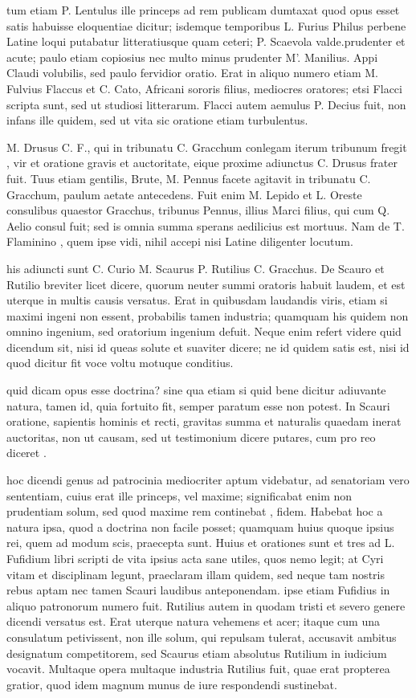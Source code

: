  tum etiam P. Lentulus ille princeps ad rem publicam dumtaxat quod opus esset satis habuisse eloquentiae dicitur; isdemque temporibus L. Furius Philus perbene Latine loqui putabatur litteratiusque quam ceteri; P. Scaevola valde.prudenter et acute; paulo etiam copiosius nec multo minus prudenter M'. Manilius. Appi Claudi volubilis, sed paulo fervidior oratio. Erat in aliquo numero etiam M. Fulvius Flaccus et C. Cato, Africani sororis filius, mediocres oratores; etsi Flacci scripta sunt, sed ut studiosi litterarum. Flacci autem aemulus P. Decius fuit, non infans ille quidem, sed ut vita sic oratione etiam turbulentus.

 M. Drusus C. F., qui in tribunatu C. Gracchum conlegam iterum tribunum fregit , vir et oratione gravis et auctoritate, eique proxime adiunctus C. Drusus frater fuit. Tuus etiam gentilis, Brute, M. Pennus facete agitavit in tribunatu C. Gracchum, paulum aetate antecedens. Fuit enim M. Lepido et L. Oreste consulibus quaestor Gracchus, tribunus Pennus, illius Marci filius, qui cum Q. Aelio consul fuit; sed is omnia summa sperans aedilicius est mortuus. Nam de T. Flaminino , quem ipse vidi, nihil accepi nisi Latine diligenter locutum.

 his adiuncti sunt C. Curio M. Scaurus P. Rutilius C. Gracchus. De Scauro et Rutilio breviter licet dicere, quorum neuter summi oratoris habuit laudem, et est uterque in multis causis versatus. Erat in quibusdam laudandis viris, etiam si maximi ingeni non essent, probabilis tamen industria; quamquam his quidem non omnino ingenium, sed oratorium ingenium defuit. Neque enim refert videre quid dicendum sit, nisi id queas solute et suaviter dicere; ne id quidem satis est, nisi id quod dicitur fit voce voltu motuque conditius.

 quid dicam opus esse doctrina? sine qua etiam si quid bene dicitur adiuvante natura, tamen id, quia fortuito fit, semper paratum esse non potest. In Scauri oratione, sapientis hominis et recti, gravitas summa et naturalis quaedam inerat auctoritas, non ut causam, sed ut testimonium dicere putares, cum pro reo diceret .

 hoc dicendi genus ad patrocinia mediocriter aptum videbatur, ad senatoriam vero sententiam, cuius erat ille princeps, vel maxime; significabat enim non prudentiam solum, sed quod maxime rem continebat , fidem. Habebat hoc a natura ipsa, quod a doctrina non facile posset; quamquam huius quoque ipsius rei, quem ad modum scis, praecepta sunt. Huius et orationes sunt et tres ad L. Fufidium libri scripti de vita ipsius acta sane utiles, quos nemo legit; at Cyri vitam et disciplinam legunt, praeclaram illam quidem, sed neque tam nostris rebus aptam nec tamen Scauri laudibus anteponendam. ipse etiam Fufidius in aliquo patronorum numero fuit. Rutilius autem in quodam tristi et severo genere dicendi versatus est. Erat uterque natura vehemens et acer; itaque cum una consulatum petivissent, non ille solum, qui repulsam tulerat, accusavit ambitus designatum competitorem, sed Scaurus etiam absolutus Rutilium in iudicium vocavit. Multaque opera multaque industria Rutilius fuit, quae erat propterea gratior, quod idem magnum munus de iure respondendi sustinebat.

